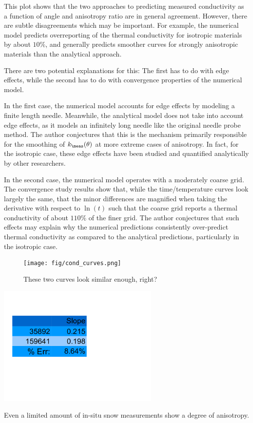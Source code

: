 This plot shows that the two approaches to predicting measured conductivity
as a function of angle and anisotropy ratio are in general agreement. However,
there are subtle disagreements which may be important. For example, the
numerical model predicts overreporting of the thermal conductivity for
isotropic materials by about \(10\%\), and generally predicts smoother
curves for strongly anisotropic materials than the analytical approach.

There are two potential explanations for this: The first has to do with edge
effects, while the second has to do with convergence properties of the numerical
model.

In the first case, the numerical model accounts for edge effects by
modeling a finite length needle. Meanwhile, the analytical model does not take
into account edge effects, as it models an infinitely long needle like the
original needle probe method. The author conjectures that this is the mechanism
primarily responsible for the smoothing of \(k_{\meas}(\theta)\) at more extreme
cases of anisotropy. In fact, for the isotropic case, these edge effects have
been studied and quantified analytically by other researchers.


In the second case, the numerical model operates with a moderately coarse grid.
The convergence study results show that, while the time/temperature curves look
largely the same, that the minor differences are magnified when taking the
derivative with respect to \(\ln(t)\) such that the coarse grid reports a
thermal conductivity of about \(110\%\) of the finer grid. The author
conjectures that such effects may explain why the numerical predictions
consistently over-predict thermal conductivity as compared to the analytical
predictions, particularly in the isotropic case.


\begin{figure}[h]
\centering
\texttt{[image: fig/cond\_curves.png]}
\label{fig:conv_curves}
\caption{These two curves look similar enough, right?}
\end{figure}


\begin{table}[h]
\centering
\includegraphics[width=0.6\textwidth]{fig/conv_kvals.png}
\label{tab:conv_kvals}
\caption{Even a limited amount of in-situ snow measurements show a degree of
anisotropy.}
\end{table}

